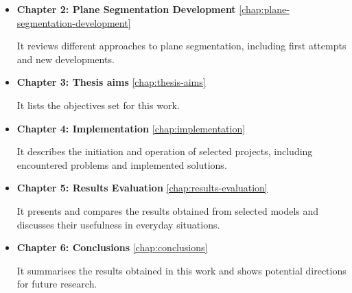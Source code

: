 \begin{itemize}
\item \textbf{Chapter 2: Plane Segmentation Development} \ref{chap:plane-segmentation-development}

It reviews different approaches to plane segmentation, including first attempts and new developments.

\item \textbf{Chapter 3: Thesis aims} \ref{chap:thesis-aims}

It lists the objectives set for this work.

\item \textbf{Chapter 4: Implementation} \ref{chap:implementation}

It describes the initiation and operation of selected projects,
including encountered problems and implemented solutions.

\item \textbf{Chapter 5: Results Evaluation} \ref{chap:results-evaluation}

It presents and compares the results obtained from selected models
and discusses their usefulness in everyday situations.

\item \textbf{Chapter 6: Conclusions} \ref{chap:conclusions}

It summarises the results obtained in this work and shows potential directions for future research.

\end{itemize}
